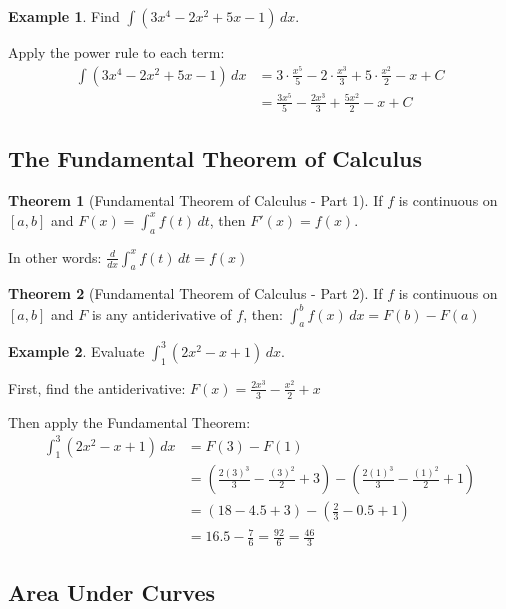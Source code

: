 \documentclass[12pt,a4paper]{book}
\theoremstyle{definition}
\newtheorem{example}{Example}[chapter]
\newtheorem{theorem}{Theorem}[chapter]
\begin{document}
\begin{example}
Find $\int (3x^4 - 2x^2 + 5x - 1) \, dx$.

Apply the power rule to each term:
\begin{align}
\int (3x^4 - 2x^2 + 5x - 1) \, dx &= 3 \cdot \frac{x^5}{5} - 2 \cdot \frac{x^3}{3} + 5 \cdot \frac{x^2}{2} - x + C\\
&= \frac{3x^5}{5} - \frac{2x^3}{3} + \frac{5x^2}{2} - x + C
\end{align}
\end{example}

\subsection{The Fundamental Theorem of Calculus}

\begin{theorem}[Fundamental Theorem of Calculus - Part 1]
If $f$ is continuous on $[a,b]$ and $F(x) = \int_a^x f(t) \, dt$, then $F'(x) = f(x)$.

In other words: $\frac{d}{dx} \int_a^x f(t) \, dt = f(x)$
\end{theorem}

\begin{theorem}[Fundamental Theorem of Calculus - Part 2]
If $f$ is continuous on $[a,b]$ and $F$ is any antiderivative of $f$, then:
$\int_a^b f(x) \, dx = F(b) - F(a)$
\end{theorem}

\begin{example}
Evaluate $\int_1^3 (2x^2 - x + 1) \, dx$.

First, find the antiderivative:
$F(x) = \frac{2x^3}{3} - \frac{x^2}{2} + x$

Then apply the Fundamental Theorem:
\begin{align}
\int_1^3 (2x^2 - x + 1) \, dx &= F(3) - F(1)\\
&= \left(\frac{2(3)^3}{3} - \frac{(3)^2}{2} + 3\right) - \left(\frac{2(1)^3}{3} - \frac{(1)^2}{2} + 1\right)\\
&= \left(18 - 4.5 + 3\right) - \left(\frac{2}{3} - 0.5 + 1\right)\\
&= 16.5 - \frac{7}{6} = \frac{92}{6} = \frac{46}{3}
\end{align}
\end{example}

\subsection{Area Under Curves}
\end{document}
